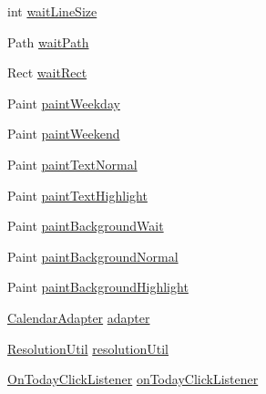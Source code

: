 \begin{DoxyCompactItemize}
\item 
int \mbox{\hyperlink{classcom_1_1example_1_1akisame__lin_1_1love__air2_1_1_bean_1_1_sign_view_a852f099ecd8f619331ed6bf8716422de}{wait\+Line\+Size}}
\item 
Path \mbox{\hyperlink{classcom_1_1example_1_1akisame__lin_1_1love__air2_1_1_bean_1_1_sign_view_a8c346a159dbd19d629d31b9450164c13}{wait\+Path}}
\item 
Rect \mbox{\hyperlink{classcom_1_1example_1_1akisame__lin_1_1love__air2_1_1_bean_1_1_sign_view_aee12d9e4a50a79e2c015cee647bc92ba}{wait\+Rect}}
\item 
Paint \mbox{\hyperlink{classcom_1_1example_1_1akisame__lin_1_1love__air2_1_1_bean_1_1_sign_view_aa01dbd5dc09b12006a46a7e13db6e4e7}{paint\+Weekday}}
\item 
Paint \mbox{\hyperlink{classcom_1_1example_1_1akisame__lin_1_1love__air2_1_1_bean_1_1_sign_view_a87a650297ca14f31b44974e63371db76}{paint\+Weekend}}
\item 
Paint \mbox{\hyperlink{classcom_1_1example_1_1akisame__lin_1_1love__air2_1_1_bean_1_1_sign_view_a434f2124ee8a24c9b1795c32fc2836f8}{paint\+Text\+Normal}}
\item 
Paint \mbox{\hyperlink{classcom_1_1example_1_1akisame__lin_1_1love__air2_1_1_bean_1_1_sign_view_a98bbba33dceaf76c72b4da9ae28f1e86}{paint\+Text\+Highlight}}
\item 
Paint \mbox{\hyperlink{classcom_1_1example_1_1akisame__lin_1_1love__air2_1_1_bean_1_1_sign_view_a0e3416f186544b4942761bea692bfe79}{paint\+Background\+Wait}}
\item 
Paint \mbox{\hyperlink{classcom_1_1example_1_1akisame__lin_1_1love__air2_1_1_bean_1_1_sign_view_a8d684f30fc34ce53700821dcffb6030f}{paint\+Background\+Normal}}
\item 
Paint \mbox{\hyperlink{classcom_1_1example_1_1akisame__lin_1_1love__air2_1_1_bean_1_1_sign_view_a824cddbd9e04432714f29f46afef83b2}{paint\+Background\+Highlight}}
\item 
\mbox{\hyperlink{classcom_1_1example_1_1akisame__lin_1_1love__air2_1_1presenter_1_1_calendar_adapter}{Calendar\+Adapter}} \mbox{\hyperlink{classcom_1_1example_1_1akisame__lin_1_1love__air2_1_1_bean_1_1_sign_view_a3bbef22a82afa7a83198ab3b85fbee3c}{adapter}}
\item 
\mbox{\hyperlink{classcom_1_1example_1_1akisame__lin_1_1love__air2_1_1_bean_1_1_resolution_util}{Resolution\+Util}} \mbox{\hyperlink{classcom_1_1example_1_1akisame__lin_1_1love__air2_1_1_bean_1_1_sign_view_a6c7aa9964cf6ab5ebf8be8e63c69d7e2}{resolution\+Util}}
\item 
\mbox{\hyperlink{interfacecom_1_1example_1_1akisame__lin_1_1love__air2_1_1_bean_1_1_sign_view_1_1_on_today_click_listener}{On\+Today\+Click\+Listener}} \mbox{\hyperlink{classcom_1_1example_1_1akisame__lin_1_1love__air2_1_1_bean_1_1_sign_view_ab7203231ddb3a8339dcb22bea4fd10df}{on\+Today\+Click\+Listener}}
\end{DoxyCompactItemize}
